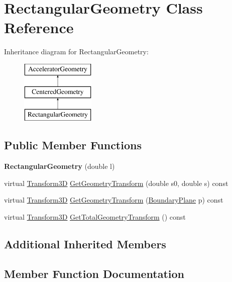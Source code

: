 \hypertarget{classRectangularGeometry}{}\section{Rectangular\+Geometry Class Reference}
\label{classRectangularGeometry}
Inheritance diagram for Rectangular\+Geometry\+:\begin{figure}[H]
\begin{center}
\leavevmode
\includegraphics[height=3.000000cm]{classRectangularGeometry}
\end{center}
\end{figure}
\subsection*{Public Member Functions}
\begin{DoxyCompactItemize}
\item 
\mbox{\label{classRectangularGeometry_a25c95fc917e135faed4133f369c1ad51}} 
{\bfseries Rectangular\+Geometry} (double l)
\item 
virtual \hyperlink{classTransform3D}{Transform3D} \hyperlink{classRectangularGeometry_a2e25d8cd4902949308ffd031544ca8c9}{Get\+Geometry\+Transform} (double s0, double s) const
\item 
virtual \hyperlink{classTransform3D}{Transform3D} \hyperlink{classRectangularGeometry_a21891a331a7ac6cb4283d95115c29020}{Get\+Geometry\+Transform} (\hyperlink{classAcceleratorGeometry_a5c1661938176102f235836f5a8be6034}{Boundary\+Plane} p) const
\item 
virtual \hyperlink{classTransform3D}{Transform3D} \hyperlink{classRectangularGeometry_a830506a331c8b08def936613ed727c62}{Get\+Total\+Geometry\+Transform} () const
\end{DoxyCompactItemize}
\subsection*{Additional Inherited Members}


\subsection{Member Function Documentation}
\mbox{\label{classRectangularGeometry_a2e25d8cd4902949308ffd031544ca8c9}} 
